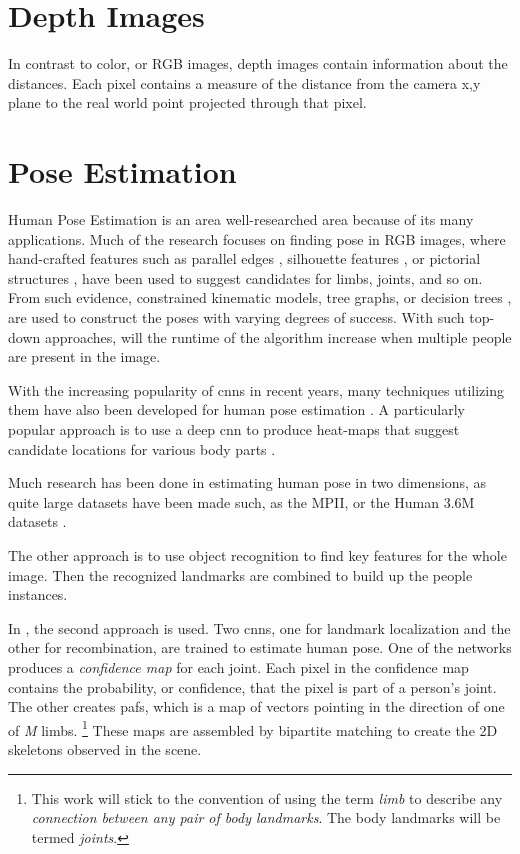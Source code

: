 \section{Depth Images}
In contrast to color, or RGB images, depth images contain information about the distances. Each pixel contains a measure of the distance from the camera x,y plane to the real world point projected through that pixel. 





\section{Pose Estimation}
Human Pose Estimation is an area well-researched area because of its many applications. Much of the research focuses on finding pose in RGB images, where hand-crafted features such as parallel edges \cite{ramanan2003,mori2002}, silhouette features \cite{grauman2003}, or pictorial structures \cite{fischler1973,felzenszwalb2005}, have been used to suggest candidates for limbs, joints, and so on. From such evidence, constrained kinematic models, tree graphs, or decision trees \cite{shotton2013}, are used to construct the poses with varying degrees of success. With such top-down approaches, will the runtime of the algorithm increase when multiple people are present in the image.

With the increasing popularity of \gls{cnn}s in recent years, many techniques utilizing them have also been developed for human pose estimation \cite{tompson2014joint}. A particularly popular approach is to use a deep \gls{cnn} to produce heat-maps that suggest candidate locations for various body parts \cite{wei2016cpm,wang2016}.

Much research has been done in estimating human pose in two dimensions, as quite large datasets have been made such, as the MPII, or the Human 3.6M datasets \cite{andriluka14cvpr,h36m_pami}.

The other approach is to use object recognition to find key features for the whole image. Then the recognized landmarks are combined to build up the people instances.

In \cite{cao2017realtime}, the second approach is used. Two \gls{cnn}s, one for landmark localization and the other for recombination, are trained to estimate human pose. One of the networks produces a \emph{confidence map} for each joint. Each pixel in the confidence map contains the probability, or confidence, that the pixel is part of a person's joint. The other creates \gls{paf}s, which is a map of vectors pointing in the direction of one of \emph{M} limbs. \footnote{This work will stick to the convention of using the term \emph{limb} to describe any \emph{connection between any pair of body landmarks}. The body landmarks will be termed \emph{joints}.} These maps are assembled by bipartite matching to create the 2D skeletons observed in the scene.

